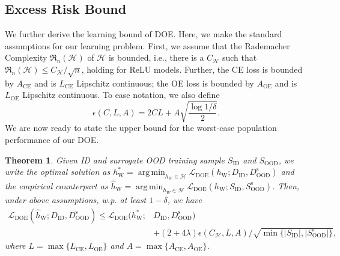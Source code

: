 \documentclass{article} \usepackage{iclr2022_conference,times}
\DeclareMathOperator*{\argmin}{arg\,min}
\newtheorem{theorem}{Theorem}
\begin{document}
\subsection{Excess Risk Bound} \label{sec: bound}
We further derive the learning bound of DOE. Here, we make the standard assumptions for our learning problem. First, we assume that the Rademacher Complexity ${\mathfrak{R}}_n(\mathcal{H})$ of $\mathcal{H}$ is bounded, i.e., there is a $C_\mathcal{H}$ such that ${\mathfrak{R}}_n(\mathcal{H})\le C_\mathcal{H}/\sqrt{n}$, holding for ReLU models. Further, the CE loss is bounded by $A_\text{CE}$ and is $L_\text{CE}$ Lipschitz continuous; the OE loss is bounded by $A_\text{OE}$ and is $L_\text{OE}$ Lipschitz continuous. To ease notation, we also define 
\begin{equation}
    \epsilon(C,L,A)=2CL + A\sqrt{\frac{\log 1/ \delta}{2}}. 
\end{equation}
We are now ready to state the upper bound for the worst-case population performance of our DOE. 
\begin{theorem}\label{theo3}
\label{theo: rademacher} Given ID and surrogate OOD training sample $S_\text{ID}$ and $S_\text{OOD}$, we write the optimal solution as $h_\text{W}^*=\argmin_{h_W\in\mathcal{H}} \mathcal{L}_\text{DOE}({h}_\text{W}; D_\text{ID}, D^\text{s}_\text{OOD})$ and the empirical counterpart as $\hat{h}_\text{W}=\argmin_{h_W\in\mathcal{H}} \mathcal{L}_\text{DOE}({h}_\text{W}; S_\text{ID}, S^\text{s}_\text{OOD})$. 
Then, under above assumptions, w.p. at least $1-\delta$, we have
\begin{align}
    \mathcal{L}_\text{DOE}(\hat{h}_\text{W}; D_\text{ID},  D^\text{s}_\text{OOD}) \le \mathcal{L}_\text{DOE} (h^*_\text{W};&  D_\text{ID}, D^\text{s}_\text{OOD})\nonumber \\ & + (2 + 4 \lambda) \epsilon(C_\mathcal{H}, L, A) / \sqrt{\min\{\lvert S_\text{ID}\rvert, \lvert S_\text{OOD}^\text{s}\rvert\}},
\end{align}
where $L = \max\{L_\text{CE}, L_\text{OE}\}$ and $A = \max\{A_\text{CE}, A_\text{OE}\}$. 
\end{theorem}
\end{document}
